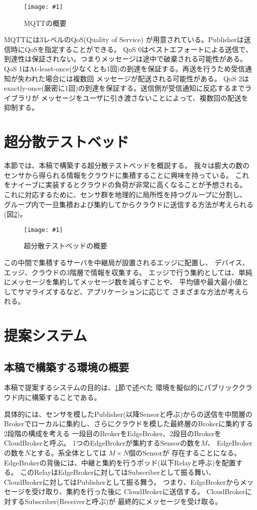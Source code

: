 \documentclass[submit,techrep]{ipsj}
\newcommand{\reffig}[1]{図\ref{#1}}
\newcommand{\epsfig}[4]{
\begin{figure}[tb]
  \begin{center}
    \texttt{[image: \#1]}
  \end{center}
  \caption{#3}
  \label{#4}
\end{figure}}
\begin{document}
\epsfig{figs/mqtt.pdf}{width=6.0cm}{MQTTの概要}{mqtt}

MQTTには3レベルのQoS(Quality of Service) が用意されている。Publisherは送信時にQoSを指定することができる。
QoS 0はベストエフォートによる送信で、到達性は保証されない。つまりメッセージは途中で破棄される可能性がある。
QoS 1はAt-least-once(少なくとも1回)の到達を保証する。再送を行うため受信通知が失われた場合には複数回
メッセージが配送される可能性がある。
QoS 2はexactly-once(厳密に1回)の到達を保証する。送信側が受信通知に反応するまでライブラリが
メッセージをユーザに引き渡さないことによって、複数回の配送を抑制する。


\section{超分散テストベッド}\label{sec:testbed}
本節では、本稿で構築する超分散テストベッドを概説する。
我々は膨大の数のセンサから得られる情報をクラウドに集積することに興味を持っている。
これをナイーブに実装するとクラウドの負荷が非常に高くなることが予想される。
これに対応するために、センサ群を地理的に局所性を持つグループに分割し、
グループ内で一旦集積および集約してからクラウドに送信する方法が考えられる(\reffig{continuum})。

\epsfig{figs/proposed.pdf}{width=8.0cm}{超分散テストベッドの概要}{continuum}

この中間で集積するサーバを中継局が設置されるエッジに配置し、
デバイス、エッジ、クラウドの3階層で情報を収集する。
エッジで行う集約としては、単純にメッセージを集約してメッセージ数を減らすことや、
平均値や最大最小値としてサマライズするなど、アプリケーションに応じて
さまざまな方法が考えられる。



\section{提案システム}\label{sec:proposal}

\subsection{本稿で構築する環境の概要}
本稿で提案するシステムの目的は、\ref{sec:testbed}節で述べた
環境を擬似的にパブリッククラウド内に構築することである。

具体的には、センサを模したPublisher(以降Sensorと呼ぶ)からの送信を中間層の
Brokerでローカルに集約し、さらにクラウドを模した最終層のBrokerに集約する
2段階の構成を考える
一段目のBrokerをEdgeBroker、2段目のBrokerをCloudBrokerと呼ぶ。
1つのEdgeBrokerが集約するSensorの数を$M$、
EdgeBrokerの数を$N$とする。系全体としては $M \times N$個のSensorが
存在することになる。
EdgeBrokerの背後には、中継と集約を行うポッド(以下Relayと呼ぶ)を配置する。
このRelayはEdgeBrokerに対してはSubscriberとして振る舞い、
CloudBrokerに対してはPublisherとして振る舞う。
つまり、EdgeBrokerからメッセージを受け取り、集約を行った後に
CloudBrokerに送信する。
CloudBrokerに対するSubscriber(Receiverと呼ぶ)が
最終的にメッセージを受け取る。
\end{document}
